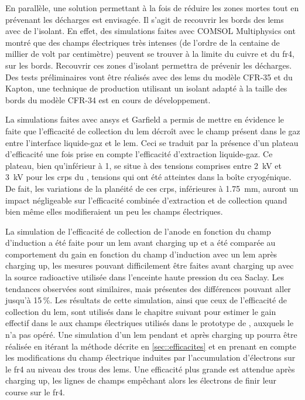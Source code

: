     En parallèle, une solution permettant à la fois de réduire les zones mortes tout en prévenant les décharges est envisagée. Il s'agit de recouvrir les bords des \glspl{lem} avec de l'isolant. En effet, des simulations faites avec COMSOL Multiphysics ont montré que des champs électriques très intenses (de l'ordre de la centaine de millier de volt par centimètre) peuvent se trouver à la limite du cuivre et du \gls{fr4}, sur les bords. Recouvrir ces zones d'isolant permettra de prévenir les décharges. Des tests préliminaires vont être réalisés avec des \glspl{lem} du modèle CFR-35 et du Kapton, une technique de production utilisant un isolant adapté à la taille des bords du modèle CFR-34 est en cours de développement.

    La simulations faites avec \gls{ansys} et Garfield a permis de mettre en évidence le faite que l'efficacité de collection du \gls{lem} décroît avec le champ présent dans le gaz entre l'interface liquide-gaz et le \gls{lem}. Ceci se traduit par la présence d'un plateau d'efficacité une fois prise en compte l'efficacité d'extraction liquide-gaz. Ce plateau, bien qu'inférieur à 1, se situe à des tensions comprises entre \SI{2}{\kilo\volt} et \SI{3}{\kilo\volt} pour les \glspl{crp} du \SSS{}, tensions qui ont été atteintes dans la boîte cryogénique. De fait, les variations de la planéité de ces \glspl{crp}, inférieures à \SI{1.75}{\milli\meter}, auront un impact négligeable sur l'efficacité combinée d'extraction et de collection quand bien même elles modifieraient un peu les champs électriques.

    La simulation de l'efficacité de collection de l'anode en fonction du champ d'induction a été faite pour un \gls{lem} avant charging up et a été comparée au comportement du gain en fonction du champ d'induction avec un \gls{lem} après charging up, les mesures pouvant difficilement être faites avant charging up avec la source radioactive utilisée dans l'enceinte haute pression du \gls{cea} Saclay. Les tendances observées sont similaires, mais présentes des différences pouvant aller jusqu'à 15\,\%. Les résultats de cette simulation, ainsi que ceux de l'efficacité de collection du \gls{lem}, sont utilisés dans le chapitre suivant pour estimer le gain effectif dans le \TOO{} aux champs électriques utilisés dans le prototype de \threeL{}, auxquels le \TOO{} n'a pas opéré. Une simulation d'un \gls{lem} pendant et après charging up pourra être réalisée en itérant la méthode décrite en \autoref{sec::efficacites} et en prenant en compte les modifications du champ électrique induites par l'accumulation d'électrons sur le \gls{fr4} au niveau des trous des \glspl{lem}. Une efficacité plus grande est attendue après charging up, les lignes de champs empêchant alors les électrons de finir leur course sur le \gls{fr4}.

\FloatBarrier

\printbibliography